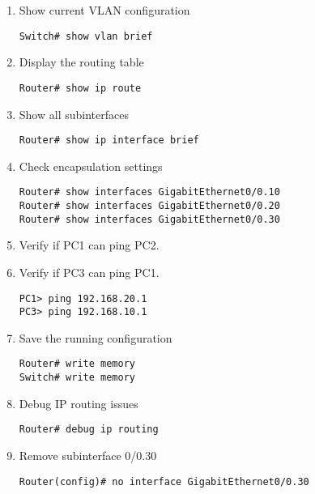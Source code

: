 \documentclass[a4paper]{book}
\begin{document}
\begin{enumerate}
\item{Show current VLAN configuration}

\begin{lstlisting}
Switch# show vlan brief
\end{lstlisting}

\item{Display the routing table}

\begin{lstlisting}
Router# show ip route
\end{lstlisting}

\item{Show all subinterfaces}

\begin{lstlisting}
Router# show ip interface brief
\end{lstlisting}

\item{Check encapsulation settings}

\begin{lstlisting}
Router# show interfaces GigabitEthernet0/0.10
Router# show interfaces GigabitEthernet0/0.20
Router# show interfaces GigabitEthernet0/0.30
\end{lstlisting}

\item{Verify if PC1 can ping PC2.}
\item{Verify if PC3 can ping PC1.}
 
\begin{lstlisting}
PC1> ping 192.168.20.1
PC3> ping 192.168.10.1
\end{lstlisting}

\item{Save the running configuration}

\begin{lstlisting}
Router# write memory
Switch# write memory
\end{lstlisting}

\item{Debug IP routing issues}

\begin{lstlisting}
Router# debug ip routing
\end{lstlisting}

\item{Remove subinterface 0/0.30}

\begin{lstlisting}
Router(config)# no interface GigabitEthernet0/0.30
\end{lstlisting}


\end{enumerate}
\end{document}

